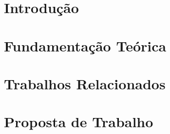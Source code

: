 \documentclass[qualificacao, mestrado, english, brazil]{packages/icmc}
\begin{document}
\textual

\chapter{Introdução}
\label{chapter:introducao}


\chapter{Fundamentação Teórica}
\label{chapter:fundamentacao-teorica}


\chapter{Trabalhos Relacionados}
\label{chapter:trabalhos-relacionados}


\chapter{Proposta de Trabalho}
\label{chapter:proposta-trabalho}



% 

\postextual







\glsaddall


%
%    
%    
%    
%
\end{document}
